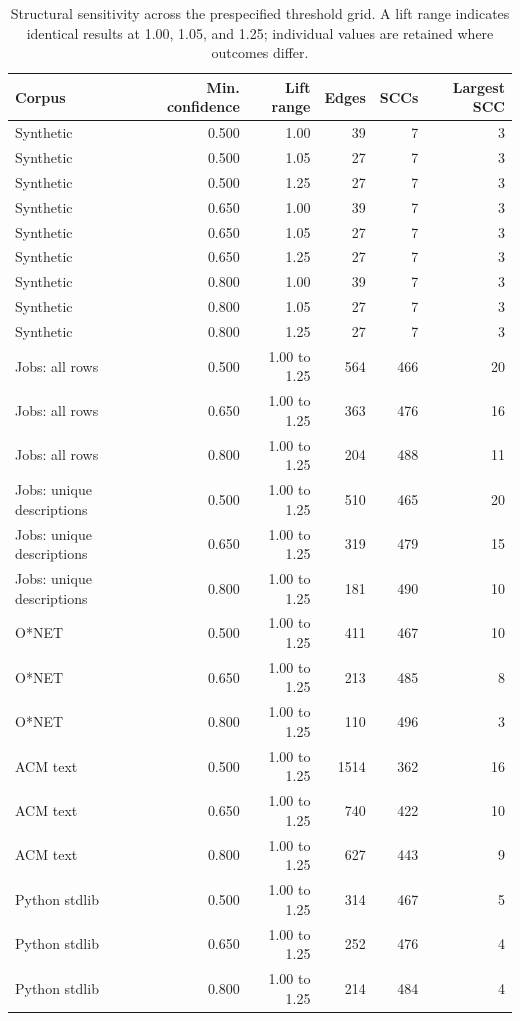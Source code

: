 \begin{table}[t]
  \caption{Structural sensitivity across the prespecified threshold grid. A lift range indicates identical results at 1.00, 1.05, and 1.25; individual values are retained where outcomes differ.}
  \label{tab:threshold-sensitivity}
  \centering
  \small
  \begin{tabular}{lrrrrr}
    \toprule
    Corpus & Min. confidence & Lift range & Edges & SCCs & Largest SCC \\
    \midrule
    Synthetic & 0.500 & 1.00 & 39 & 7 & 3 \\
    Synthetic & 0.500 & 1.05 & 27 & 7 & 3 \\
    Synthetic & 0.500 & 1.25 & 27 & 7 & 3 \\
    Synthetic & 0.650 & 1.00 & 39 & 7 & 3 \\
    Synthetic & 0.650 & 1.05 & 27 & 7 & 3 \\
    Synthetic & 0.650 & 1.25 & 27 & 7 & 3 \\
    Synthetic & 0.800 & 1.00 & 39 & 7 & 3 \\
    Synthetic & 0.800 & 1.05 & 27 & 7 & 3 \\
    Synthetic & 0.800 & 1.25 & 27 & 7 & 3 \\
    Jobs: all rows & 0.500 & 1.00 to 1.25 & 564 & 466 & 20 \\
    Jobs: all rows & 0.650 & 1.00 to 1.25 & 363 & 476 & 16 \\
    Jobs: all rows & 0.800 & 1.00 to 1.25 & 204 & 488 & 11 \\
    Jobs: unique descriptions & 0.500 & 1.00 to 1.25 & 510 & 465 & 20 \\
    Jobs: unique descriptions & 0.650 & 1.00 to 1.25 & 319 & 479 & 15 \\
    Jobs: unique descriptions & 0.800 & 1.00 to 1.25 & 181 & 490 & 10 \\
    O*NET & 0.500 & 1.00 to 1.25 & 411 & 467 & 10 \\
    O*NET & 0.650 & 1.00 to 1.25 & 213 & 485 & 8 \\
    O*NET & 0.800 & 1.00 to 1.25 & 110 & 496 & 3 \\
    ACM text & 0.500 & 1.00 to 1.25 & 1514 & 362 & 16 \\
    ACM text & 0.650 & 1.00 to 1.25 & 740 & 422 & 10 \\
    ACM text & 0.800 & 1.00 to 1.25 & 627 & 443 & 9 \\
    Python stdlib & 0.500 & 1.00 to 1.25 & 314 & 467 & 5 \\
    Python stdlib & 0.650 & 1.00 to 1.25 & 252 & 476 & 4 \\
    Python stdlib & 0.800 & 1.00 to 1.25 & 214 & 484 & 4 \\
    \bottomrule
  \end{tabular}
\end{table}
